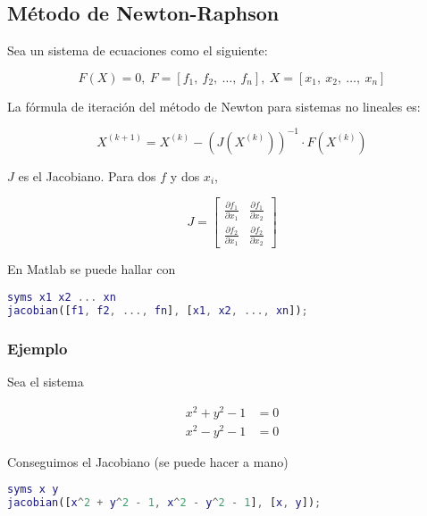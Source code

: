 \documentclass{article}
\begin{document}
\subsection{Método de Newton-Raphson}

Sea un sistema de ecuaciones como el siguiente:

\begin{equation*}
    F(X) = 0,\ F = \left[f_1,\ f_2,\ \dots,\ f_n\right],\ X = \left[x_1,\ x_2,\ \dots,\ x_n\right]
\end{equation*}

La fórmula de iteración del método de Newton para sistemas no lineales es:

\begin{equation}\label{eq:Newton}
    X^{(k+1)} = X^{(k)} - \left(J\left(X^{(k)}\right)\right)^{-1} \cdot F\left(X^{(k)}\right)
\end{equation}

$J$ es el Jacobiano. Para dos $f$ y dos $x_i$,

\begin{equation*}
    J = \begin{bmatrix}
    \frac{\partial f_1}{\partial x_1} & \frac{\partial f_1}{\partial x_2} \\
    \frac{\partial f_2}{\partial x_1} & \frac{\partial f_2}{\partial x_2}
    \end{bmatrix}
\end{equation*}

En Matlab se puede hallar con

\begin{lstlisting}[language=Matlab]
syms x1 x2 ... xn
jacobian([f1, f2, ..., fn], [x1, x2, ..., xn]);
\end{lstlisting}

\subsubsection{Ejemplo}

Sea el sistema

\begin{align*}
    x^2 + y^2 - 1 &= 0 \\
    x^2 - y^2 - 1 &= 0
\end{align*}

Conseguimos el Jacobiano (se puede hacer a mano)

\begin{lstlisting}[language=Matlab]
syms x y
jacobian([x^2 + y^2 - 1, x^2 - y^2 - 1], [x, y]);
\end{lstlisting}
\end{document}
